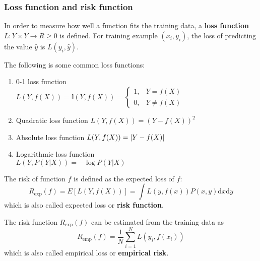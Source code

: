 \subsubsection{Loss function and risk function}
\label{sec:Loss-function-and-risk-function}

\begin{definition}
In order to measure how well a function fits the training data, a \textbf{loss function} $L:Y \times Y \rightarrow R \geq 0$ is defined. For training example $(x_i,y_i)$, the loss of predicting the value $\widehat{y}$ is $L(y_i,\widehat{y})$.
\end{definition}

The following is some common loss functions:
\begin{enumerate}
\item 0-1 loss function \\ $L(Y,f(X))=\mathbb{I}(Y,f(X))=\begin{cases} 1, & Y=f(X) \\ 0, & Y \neq f(X) \end{cases}$
\item Quadratic loss function $L(Y,f(X))=\left(Y-f(X)\right)^2$
\item Absolute loss function $L(Y,f(X))=\left\lvert Y-f(X)\right\rvert$
\item Logarithmic loss function \\ $L(Y,P(Y|X))=-\log{P(Y|X)}$
\end{enumerate}

\begin{definition}
The risk of function $f$ is defined as the expected loss of $f$:
\begin{equation}\label{eqn:expected-loss}
R_{\mathrm{exp}}(f)=E\left[L\left(Y,f(X)\right)\right]=\int L\left(y,f(x)\right)P(x,y)\mathrm{d}x\mathrm{d}y
\end{equation}
which is also called expected loss or \textbf{risk function}.
\end{definition}

\begin{definition}
The risk function $R_{\mathrm{exp}}(f)$ can be estimated from the training data as
\begin{equation}
R_{\mathrm{emp}}(f)=\dfrac{1}{N}\sum\limits_{i=1}^{N} L\left(y_i,f(x_i)\right)
\end{equation}
which is also called empirical loss or \textbf{empirical risk}.
\end{definition}

